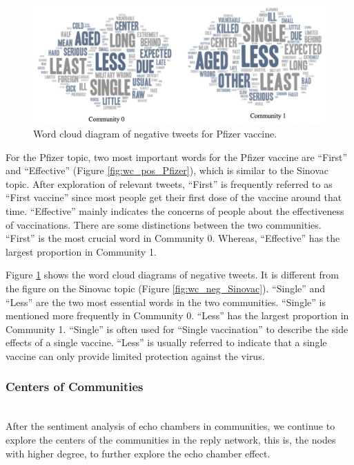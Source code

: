 \documentclass[sigplan,screen]{acmart}
\begin{document}
\begin{figure}[h]
  \centering
  \includegraphics[width=0.6\linewidth]{resource/yidan/Pfizer_wc_neg.jpeg}
  \caption{Word cloud diagram of negative tweets for Pfizer vaccine.}
  \label{fig:wc_neg_Pfizer}
\end{figure}

For the Pfizer topic, two most important words for the Pfizer vaccine are “First” and “Effective” (Figure \ref{fig:wc_pos_Pfizer}), which is similar to the Sinovac topic. After exploration of relevant tweets, “First” is frequently referred to as “First vaccine” since most people get their first dose of the vaccine around that time. “Effective” mainly indicates the concerns of people about the effectiveness of vaccinations. There are some distinctions between the two communities. “First” is the most crucial word in Community 0. Whereas, “Effective” has the largest proportion in Community 1. 

Figure \ref{fig:wc_neg_Pfizer} shows the word cloud diagrams of negative tweets. It is different from the figure on the Sinovac topic (Figure \ref{fig:wc_neg_Sinovac}). “Single” and “Less” are the two most essential words in the two communities. “Single” is mentioned more frequently in Community 0. “Less” has the largest proportion in Community 1. “Single” is often used for “Single vaccination” to describe the side effects of a single vaccine. “Less” is usually referred to indicate that a single vaccine can only provide limited protection against the virus.

\subsubsection{Centers of Communities}
~\\
After the sentiment analysis of echo chambers in communities, we continue to explore the centers of the communities in the reply network, this is, the nodes with higher degree, to further explore the echo chamber effect.
\end{document}
